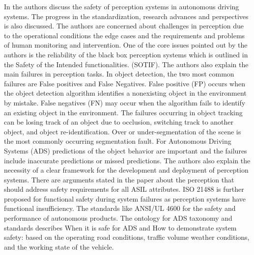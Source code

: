 {In \cite{author24} the authors discuss the safety of perception systems in autonomous driving systems. The progress in the standardization, research advances and perspectives is also discussed. The authors are concerned about challenges in perception due to the operational conditions the edge cases and the requirements and problems of human monitoring and intervention. One of the core issues pointed out by the authors is the reliability of the black box perception systems which is outlined in the Safety of the Intended functionalities. (SOTIF). The authors also explain the main failures in perception tasks. In object detection, the two most common failures are False positives and False Negatives. False positive (FP) occurs when the object detection algorithm identifies a nonexisting object in the environment by mistake. False negatives (FN) may occur when the algorithm fails to identify an existing object in the environment. The failures occurring in object tracking can be losing track of an object due to occlusion, switching track to another object, and object re-identification. Over or under-segmentation of the scene is the most commonly occurring segmentation fault. For Autonomous Driving Systems (ADS) predictions of the object behavior are important and the failures include inaccurate predictions or missed predictions. The authors also explain the necessity of a clear framework for the development and deployment of perception systems.  There are arguments stated in the paper about the perception that should address safety requirements for all ASIL attributes. ISO 21488 is further proposed for functional safety during system failures as perception systems have functional insufficiency. The standards like ANSI/UL 4600 for the safety and performance of autonomous products. The ontology for ADS  taxonomy and standards describes 
 When it is safe for ADS and How to demonstrate system safety: based on the operating road conditions, traffic volume weather conditions, and the working state of the vehicle.
}
